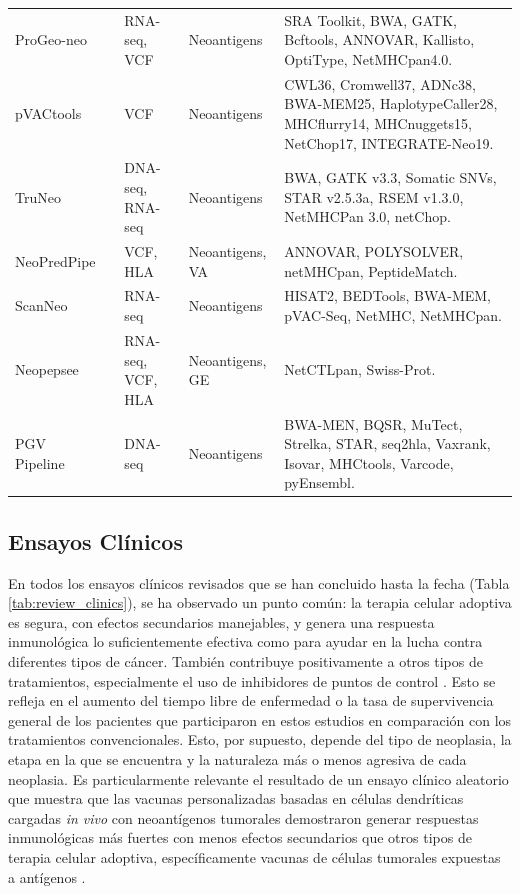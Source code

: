 \begin{table}[h]
{{\begin{tabular}{lp{2cm}p{2cm}p{2cm}p{5cm}}
				ProGeo-neo & \cite{li2020progeo} & RNA-seq, VCF & Neoantigens & SRA Toolkit, BWA, GATK, Bcftools, ANNOVAR, Kallisto, OptiType, NetMHCpan4.0. \\
				pVACtools & \cite{hundal2020pvactools} & VCF & Neoantigens & CWL36, Cromwell37, ADNc38, BWA-MEM25, HaplotypeCaller28, MHCflurry14, MHCnuggets15, NetChop17, INTEGRATE-Neo19. \\
				TruNeo &  \cite{tang2020truneo} & DNA-seq, RNA-seq & Neoantigens & BWA, GATK v3.3, Somatic SNVs, STAR v2.5.3a, RSEM v1.3.0, NetMHCPan 3.0, netChop. \\
				NeoPredPipe & \cite{schenck2019neopredpipe} & VCF, HLA & Neoantigens, VA & ANNOVAR, POLYSOLVER, netMHCpan, PeptideMatch. \\
				ScanNeo & \cite{wang2019scanneo} & RNA-seq  & Neoantigens & HISAT2, BEDTools, BWA-MEM, pVAC-Seq, NetMHC, NetMHCpan. \\
				Neopepsee & \cite{kim2018neopepsee} & RNA-seq, VCF, HLA & Neoantigens, GE & NetCTLpan, Swiss-Prot. \\ 
				PGV Pipeline & \cite{rubinsteyn2018computational}& DNA-seq & Neoantigens & BWA-MEN, BQSR, MuTect, Strelka, STAR, seq2hla, Vaxrank, Isovar, MHCtools, Varcode, pyEnsembl. \\
			\end{tabular}
		}
	}
\end{table}


\subsection{Ensayos Clínicos}


En todos los ensayos clínicos revisados que se han concluido hasta la fecha (Tabla \ref{tab:review_clinics}), se ha observado un punto común: la terapia celular adoptiva es segura, con efectos secundarios manejables, y genera una respuesta inmunológica lo suficientemente efectiva como para ayudar en la lucha contra diferentes tipos de cáncer. También contribuye positivamente a otros tipos de tratamientos, especialmente el uso de inhibidores de puntos de control \citep{awad2022personalized, ott2020phase, holm2022neoantigen, rocconi2022proof, poran2020combined, bassani2019phase}. Esto se refleja en el aumento del tiempo libre de enfermedad o la tasa de supervivencia general de los pacientes que participaron en estos estudios en comparación con los tratamientos convencionales. Esto, por supuesto, depende del tipo de neoplasia, la etapa en la que se encuentra y la naturaleza más o menos agresiva de cada neoplasia. Es particularmente relevante el resultado de un ensayo clínico aleatorio que muestra que las vacunas personalizadas basadas en células dendríticas cargadas \textit{in vivo} con neoantígenos tumorales demostraron generar respuestas inmunológicas más fuertes con menos efectos secundarios que otros tipos de terapia celular adoptiva, específicamente vacunas de células tumorales expuestas a antígenos \citep{dillman2018randomized}.


